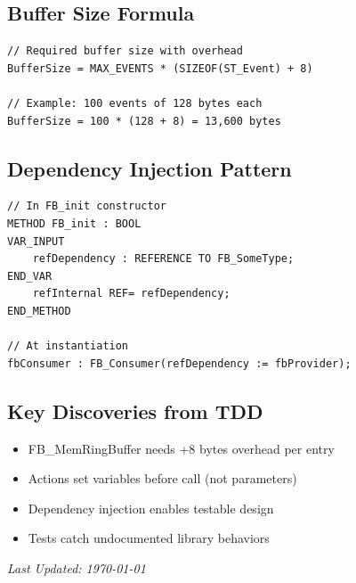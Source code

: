 \documentclass[11pt,a4paper]{article}
\begin{document}
\subsection*{Buffer Size Formula}

\begin{lstlisting}
// Required buffer size with overhead
BufferSize = MAX_EVENTS * (SIZEOF(ST_Event) + 8)

// Example: 100 events of 128 bytes each
BufferSize = 100 * (128 + 8) = 13,600 bytes
\end{lstlisting}

\subsection*{Dependency Injection Pattern}

\begin{lstlisting}
// In FB_init constructor
METHOD FB_init : BOOL
VAR_INPUT
    refDependency : REFERENCE TO FB_SomeType;
END_VAR
    refInternal REF= refDependency;
END_METHOD

// At instantiation
fbConsumer : FB_Consumer(refDependency := fbProvider);
\end{lstlisting}

\subsection*{Key Discoveries from TDD}

\begin{itemize}
    \item FB\_MemRingBuffer needs +8 bytes overhead per entry
    \item Actions set variables before call (not parameters)
    \item Dependency injection enables testable design
    \item Tests catch undocumented library behaviors
\end{itemize}

\vfill

\begin{center}
\textit{Last Updated: \today}
\end{center}
\end{document}
